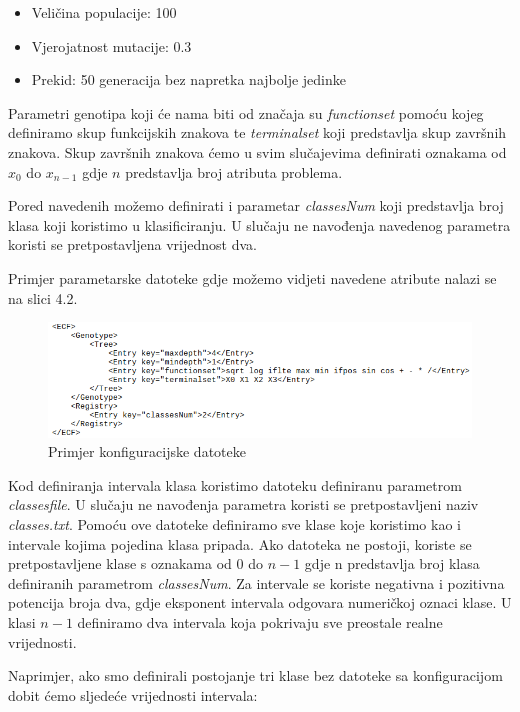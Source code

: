 \documentclass[times, utf8, zavrsni]{fer}
\begin{document}
\begin{itemize}
\item Veličina populacije: 100
\item Vjerojatnost mutacije: 0.3
\item Prekid: 50 generacija bez napretka najbolje jedinke
\end{itemize}

Parametri genotipa koji će nama biti od značaja su \textit{functionset} pomoću kojeg definiramo skup funkcijskih znakova te \textit{terminalset} koji predstavlja skup završnih znakova. Skup završnih znakova ćemo u svim slučajevima definirati oznakama od $x_0$ do $x_{n-1}$ gdje $n$ predstavlja broj atributa problema.

Pored navedenih možemo definirati i parametar \textit{classesNum} koji predstavlja broj klasa koji koristimo u klasificiranju. U slučaju ne navođenja navedenog parametra koristi se pretpostavljena vrijednost dva.

Primjer parametarske datoteke gdje možemo vidjeti navedene atribute nalazi se na slici 4.2.

\begin{figure}[htb]
\centering
\includegraphics[scale=0.6]{images/xml}
\caption{Primjer konfiguracijske datoteke}
\end{figure}

Kod definiranja intervala klasa koristimo datoteku definiranu parametrom \textit{classesfile}. U slučaju ne navođenja parametra koristi se pretpostavljeni naziv \textit{classes.txt}. Pomoću ove datoteke definiramo sve klase koje koristimo kao i intervale kojima pojedina klasa pripada. Ako datoteka ne postoji, koriste se pretpostavljene klase s oznakama od $0$ do $n-1$ gdje n predstavlja broj klasa definiranih parametrom \textit{classesNum}. Za intervale se koriste negativna i pozitivna potencija broja dva, gdje eksponent intervala odgovara numeričkoj oznaci klase. U klasi $n-1$ definiramo dva intervala koja pokrivaju sve preostale realne vrijednosti.

Naprimjer, ako smo definirali postojanje tri klase bez datoteke sa konfiguracijom dobit ćemo sljedeće vrijednosti intervala:
\end{document}
